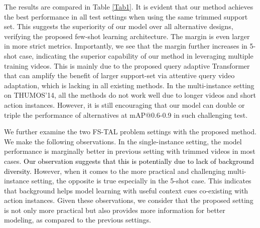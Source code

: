 \documentclass{bmvc2k}
\newcommand{\xz}[1]{\textcolor{black}{{#1}}}
\begin{document}
The results are compared in Table \ref{Tab1}.
It is evident that our method achieves the best performance in all test settings when using the same trimmed support set. 
This suggests the superiority of our model over all alternative designs, verifying the proposed few-shot learning architecture.
The margin is even larger in more strict metrics.
Importantly, we see that the margin further 
increases in 5-shot case, indicating the superior capability of our method in leveraging multiple training videos.
This is mainly due to the proposed query adaptive Transformer that can amplify the benefit of larger support-set
via attentive query video adaptation,
 which is lacking in all existing methods.
In the multi-instance setting on THUMOS'14,
all the methods do not work well due to longer videos
and short action instances.
However, it is still encouraging that our model can double or triple the performance of alternatives at mAP@0.6-0.9
in such challenging test.



We further examine the two FS-TAL problem settings 
with the proposed method. 
We make the following observations.
In the single-instance setting,
the model performance is marginally better 
in previous setting with trimmed videos in most cases.
\xz{Our observation suggests that this is potentially due to lack of background diversity.}
However, when it comes to the more practical and  challenging multi-instance setting, the opposite is true especially in the 5-shot case.
This indicates that background helps model learning
with useful context cues co-existing with action instances.
Given these observations, 
we consider that the proposed setting is not only more practical
but also provides more information for better modeling,
as compared to the previous settings.

























\vspace{-0.15in}
\end{document}

